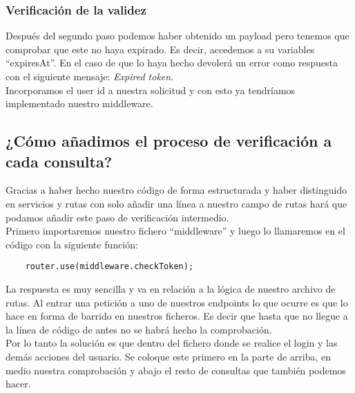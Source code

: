 \subsubsection{Verificación de la validez}
Después del segundo paso podemos haber obtenido un payload pero tenemos que comprobar que este no haya expirado. Es decir, accedemos a su variables ``expiresAt''. En el caso de que lo haya hecho devolerá un error como respuesta con el siguiente mensaje: \textit{Expired token}.
\vspace{\baselineskip}
\\Incorporamos el user id a nuestra solicitud y con esto ya tendríamos implementado nuestro middleware.

\subsection{¿Cómo añadimos el proceso de verificación a cada consulta?}
Gracias a haber hecho nuestro código de forma estructurada y haber distinguido en servicios y rutas con solo añadir una línea a nuestro campo de rutas hará que podamos añadir este paso de verificación intermedio.
\\Primero importaremos nuestro fichero ``middleware'' y luego lo llamaremos en el código con la siguiente función:
\begin{verbatim}
    router.use(middleware.checkToken);
\end{verbatim}

\begin{tcolorbox}
    [colback=green!5!white,colframe=green!75!black,fonttitle=\bfseries,title=¿Cómo iniciamos sesión si no tenemos un token?]
    La respuesta es muy sencilla y va en relación a la lógica de nuestro archivo de rutas. Al entrar una petición a uno de nuestros endpoints lo que ocurre es que lo hace en forma de barrido en nuestros ficheros. Es decir que hasta que no llegue a la línea de código de antes no se habrá hecho la comprobación.
    \\Por lo tanto la solución es que dentro del fichero donde se realice el login y las demás acciones del usuario. Se coloque este primero en la parte de arriba, en medio nuestra comprobación y abajo el resto de consultas que también podemos hacer.
\end{tcolorbox}

